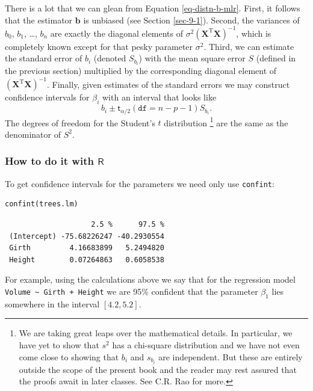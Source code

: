 \documentclass[captions=tableheading]{scrbook}
\begin{document}
There is a lot that we can glean from Equation \ref{eq-distn-b-mlr}. First, it follows that the estimator \(\mathbf{b}\) is unbiased (see Section \ref{sec-9-1}). Second, the variances of \(b_{0}\), \(b_{1}\), \ldots{}, \(b_{n}\) are exactly the diagonal elements of \(\sigma^{2}\left(\mathbf{X}^{\mathrm{T}}\mathbf{X}\right)^{-1}\), which is completely known except for that pesky parameter \(\sigma^{2}\). Third, we can estimate the standard error of \(b_{i}\) (denoted \(S_{b_{i}}\)) with the mean square error \(S\) (defined in the previous section) multiplied by the corresponding diagonal element of \(\left(\mathbf{X}^{\mathrm{T}}\mathbf{X}\right)^{-1}\). Finally, given estimates of the standard errors we may construct confidence intervals for \(\beta_{i}\) with an interval that looks like
\begin{equation}
b_{i}\pm\mathsf{t}_{\alpha/2}(\mathtt{df}=n-p-1)S_{b_{i}}.
\end{equation}
The degrees of freedom for the Student's \(t\) distribution
\footnote{We are taking great leaps over the mathematical details. In particular, we have yet to show that \(s^{2}\) has a chi-square distribution and we have not even come close to showing that \(b_{i}\) and \(s_{b_{i}}\) are independent. But these are entirely outside the scope of the present book and the reader may rest assured that the proofs await in later classes. See C.R. Rao for more.}
are the same as the denominator of \(S^{2}\). 
\subsubsection{How to do it with \(\mathsf{R}\)}
\label{sec-12-2-4-1}


To get confidence intervals for the parameters we need only use \texttt{confint}:


\lstset{language=R}
\begin{lstlisting}
confint(trees.lm)
\end{lstlisting}

\begin{verbatim}
                    2.5 %      97.5 %
 (Intercept) -75.68226247 -40.2930554
 Girth         4.16683899   5.2494820
 Height        0.07264863   0.6058538
\end{verbatim}



For example, using the calculations above we say that for the regression model \texttt{Volume \textasciitilde{} Girth + Height} we are 95\% confident that the parameter \(\beta_{1}\) lies somewhere in the interval \( [  4.2,  5.2 ] \).
\end{document}
